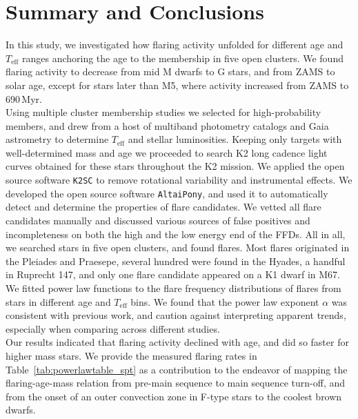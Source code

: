 \documentclass{aa}
\begin{document}
\section{Summary and Conclusions}
\label{sec:summary}
In this study, we investigated how flaring activity unfolded for different age and $T_\mathrm{eff}$ ranges anchoring the age to the membership in five open clusters. We found flaring activity to decrease from mid M dwarfs to G stars, and from ZAMS to solar age, except for stars later than M5, where activity increased from ZAMS to 690\,Myr.
\\
Using multiple cluster membership studies we selected for high-probability members, and drew from a host of multiband photometry catalogs and Gaia astrometry to determine $T_\mathrm{eff}$ and stellar luminosities. Keeping only targets with well-determined mass and age we proceeded to search K2 long cadence light curves obtained for these stars throughout the K2 mission. We applied the open source software \texttt{K2SC} to remove rotational variability and instrumental effects. We developed the open source software \texttt{AltaiPony}, and used it to automatically detect and determine the properties of flare candidates. We vetted all flare candidates manually and discussed various sources of false positives and incompleteness on both the high and the low energy end of the FFDs. All in all, we searched stars in five open clusters, and found flares. Most flares originated in the Pleiades and Praesepe, several hundred were found in the Hyades, a handful in Ruprecht 147, and only one flare candidate appeared on a K1 dwarf in M67.
\\
We fitted power law functions to the flare frequency distributions of flares from stars in different age and $T_\mathrm{eff}$ bins. We found that the power law exponent $\alpha$ was consistent with previous work, and caution against interpreting apparent trends, especially when comparing across different studies.
\\
Our results indicated that flaring activity declined with age, and did so faster for higher mass stars. We provide the measured flaring rates in Table~\ref{tab:powerlawtable_spt} as a contribution to the endeavor of mapping the flaring-age-mass relation from pre-main sequence to main sequence turn-off, and from the onset of an outer convection zone in F-type stars to the coolest brown dwarfs.
\end{document}

